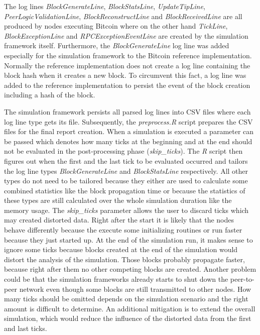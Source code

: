 The log lines \textit{BlockGenerateLine}, \textit{BlockStatsLine}, \textit{UpdateTipLine}, \textit{PeerLogicValidationLine}, \textit{BlockReconstructLine} and \textit{BlockReceivedLine} are all produced by nodes executing Bitcoin where on the other hand \textit{TickLine}, \textit{BlockExceptionLine} and \textit{RPCExceptionEventLine} are created by the simulation framework itself.
Furthermore, the \textit{BlockGenerateLine} log line was added especially for the simulation framework to the Bitcoin reference implementation.
Normally the reference implementation does not create a log line containing the block hash when it creates a new block.
To circumvent this fact, a log line was added to the reference implementation to persist the event of the block creation including a hash of the block.

The simulation framework persists all parsed log lines into CSV files where each log line type gets its file.
Subsequently, the \textit{preprocess.R} script prepares the CSV files for the final report creation.
When a simulation is executed a parameter can be passed which denotes how many ticks at the beginning and at the end should not be evaluated in the post-processing phase (\textit{skip\_ticks}).
The \textit{R} script then figures out when the first and the last tick to be evaluated occurred and tailors the log line types \textit{BlockGenerateLine} and \textit{BlockStatsLine} respectively.
All other types do not need to be tailored because they either are used to calculate some combined statistics like the block propagation time or because the statistics of these types are still calculated over the whole simulation duration like the memory usage.
The \textit{skip\_ticks} parameter allows the user to discard ticks which may created distorted data.
Right after the start it is likely that the nodes behave differently because the execute some initializing routines or run faster because they just started up.
At the end of the simulation run, it makes sense to ignore some ticks because blocks created at the end of the simulation would distort the analysis of the simulation.
Those blocks probably propagate faster, because right after them no other competing blocks are created.
Another problem could be that the simulation frameworks already starts to shut down the peer-to-peer network even though some blocks are still transmitted to other nodes.
How many ticks should be omitted depends on the simulation scenario and the right amount is difficult to determine.
An additional mitigation is to extend the overall simulation, which would reduce the influence of the distorted data from the first and last ticks.

